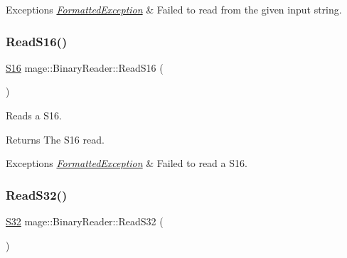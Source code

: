 \begin{DoxyExceptions}{Exceptions}
{\em \hyperlink{structmage_1_1_formatted_exception}{Formatted\+Exception}} & Failed to read from the given input string. \\
\hline
\end{DoxyExceptions}
\hypertarget{classmage_1_1_binary_reader_af3a7befd21ef51de83d702811c50a0b1}{}\label{classmage_1_1_binary_reader_af3a7befd21ef51de83d702811c50a0b1} 
\subsubsection{\texorpdfstring{Read\+S16()}{ReadS16()}}
{\footnotesize\ttfamily \hyperlink{namespacemage_add9d3fe59b2a338108e98fcd67507005}{S16} mage\+::\+Binary\+Reader\+::\+Read\+S16 (\begin{DoxyParamCaption}{ }\end{DoxyParamCaption})\hspace{0.3cm}{\ttfamily [protected]}}

Reads a {\ttfamily S16}.

\begin{DoxyReturn}{Returns}
The {\ttfamily S16} read. 
\end{DoxyReturn}

\begin{DoxyExceptions}{Exceptions}
{\em \hyperlink{structmage_1_1_formatted_exception}{Formatted\+Exception}} & Failed to read a {\ttfamily S16}. \\
\hline
\end{DoxyExceptions}
\hypertarget{classmage_1_1_binary_reader_a4711e731be78dbc45f223919c3ac4ff4}{}\label{classmage_1_1_binary_reader_a4711e731be78dbc45f223919c3ac4ff4} 
\subsubsection{\texorpdfstring{Read\+S32()}{ReadS32()}}
{\footnotesize\ttfamily \hyperlink{namespacemage_a642e05c5c83642b6946703615cdbf2da}{S32} mage\+::\+Binary\+Reader\+::\+Read\+S32 (\begin{DoxyParamCaption}{ }\end{DoxyParamCaption})\hspace{0.3cm}{\ttfamily [protected]}}


